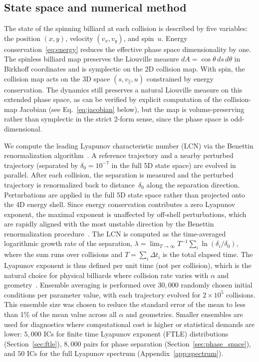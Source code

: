 \documentclass[aps,prd,twocolumn,superscriptaddress,nofootinbib,floatfix]{revtex4-2}
\begin{document}
\subsection{State space and numerical method}
\noindent
The state of the spinning billiard at each collision is described by five variables: the position $(x,y)$, velocity $(v_x, v_y)$, and spin~$u$. Energy conservation~\eqref{eq:energy} reduces the effective phase space dimensionality by one. The spinless billiard map preserves the Liouville measure $dA = \cos\theta\, ds\, d\theta$ in Birkhoff coordinates and is symplectic on the 2D collision map. With spin, the collision map acts on the 3D space $(s, v_\parallel, u)$ constrained by energy conservation. The dynamics still preserves a natural Liouville measure on this extended phase space, as can be verified by explicit computation of the collision-map Jacobian (see Eq.~\ref{eq:jacobian} below), but the map is volume-preserving rather than symplectic in the strict 2-form sense, since the phase space is odd-dimensional.

\noindent
We compute the leading Lyapunov characteristic number (LCN) via the Benettin renormalization algorithm~\cite{benettin1976,benettin1978}. A reference trajectory and a nearby perturbed trajectory (separated by $\delta_0 = 10^{-7}$ in the full 5D state space) are evolved in parallel. After each collision, the separation is measured and the perturbed trajectory is renormalized back to distance~$\delta_0$ along the separation direction. Perturbations are applied in the full 5D state space rather than projected onto the 4D energy shell. Since energy conservation contributes a zero Lyapunov exponent, the maximal exponent is unaffected by off-shell perturbations, which are rapidly aligned with the most unstable direction by the Benettin renormalization procedure~\cite{benettin1976}. The LCN is computed as the time-averaged logarithmic growth rate of the separation, $\lambda = \lim_{T\to\infty} T^{-1} \sum_i \ln(\delta_i/\delta_0)$, where the sum runs over collisions and $T = \sum_i \Delta t_i$ is the total elapsed time. The Lyapunov exponent is thus defined per unit time (not per collision), which is the natural choice for physical billiards where collision rate varies with $\alpha$ and geometry~\cite{datseris2019}. Ensemble averaging is performed over $30{,}000$ randomly chosen initial conditions per parameter value, with each trajectory evolved for $2\times10^5$ collisions. This ensemble size was chosen to reduce the standard error of the mean to less than 1\% of the mean value across all $\alpha$ and geometries. Smaller ensembles are used for diagnostics where computational cost is higher or statistical demands are lower: $5{,}000$ ICs for finite time Lyapunov exponent (FTLE) distributions (Section~\ref{sec:ftle}), $8{,}000$ pairs for phase separation (Section~\ref{sec:phase_space}), and $50$ ICs for the full Lyapunov spectrum (Appendix~\ref{app:spectrum}).
\end{document}
